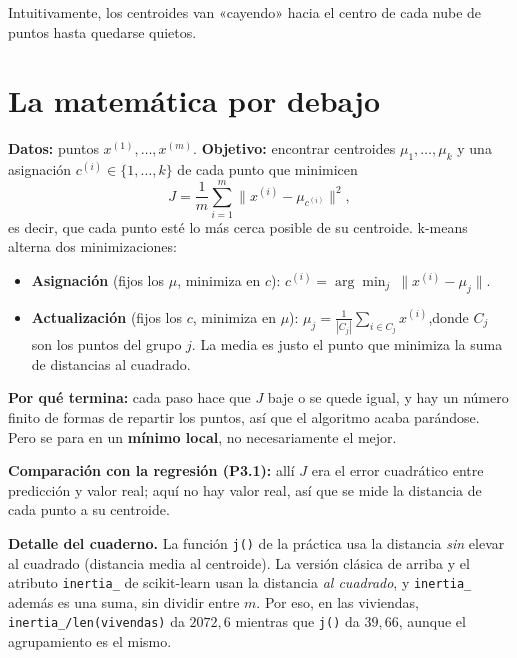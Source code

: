 \documentclass[a4paper,11pt]{article}
\begin{document}
Intuitivamente, los centroides van «cayendo» hacia el centro de cada nube de puntos hasta quedarse quietos.

\section{La matemática por debajo}

\textbf{Datos:} puntos $x^{(1)},\dots,x^{(m)}$. \textbf{Objetivo:} encontrar centroides $\mu_1,\dots,\mu_k$ y una
asignación $c^{(i)}\in\{1,\dots,k\}$ de cada punto que minimicen
\[
J=\frac{1}{m}\sum_{i=1}^{m}\bigl\lVert x^{(i)}-\mu_{c^{(i)}}\bigr\rVert^2 ,
\]
es decir, que cada punto esté lo más cerca posible de su centroide. k-means alterna dos minimizaciones:

\begin{itemize}
  \item \textbf{Asignación} (fijos los $\mu$, minimiza en $c$):\quad
        $c^{(i)}=\arg\min_{j}\ \lVert x^{(i)}-\mu_j\rVert$.
  \item \textbf{Actualización} (fijos los $c$, minimiza en $\mu$):\quad
        $\displaystyle \mu_j=\frac{1}{|C_j|}\sum_{i\in C_j}x^{(i)}$,\quad donde $C_j$ son los puntos del grupo $j$.
        La media es justo el punto que minimiza la suma de distancias al cuadrado.
\end{itemize}

\textbf{Por qué termina:} cada paso hace que $J$ baje o se quede igual, y hay un número finito de formas de repartir
los puntos, así que el algoritmo acaba parándose. Pero se para en un \textbf{mínimo local}, no necesariamente el mejor.

\textbf{Comparación con la regresión (P3.1):} allí $J$ era el error cuadrático entre predicción y valor real;
aquí no hay valor real, así que se mide la distancia de cada punto a su centroide.

\begin{ojo}
\textbf{Detalle del cuaderno.} La función \texttt{j()} de la práctica usa la distancia \emph{sin} elevar al cuadrado
(distancia media al centroide). La versión clásica de arriba y el atributo \texttt{inertia\_} de scikit-learn usan la
distancia \emph{al cuadrado}, y \texttt{inertia\_} además es una suma, sin dividir entre $m$. Por eso, en las viviendas,
\texttt{inertia\_/len(vivendas)} da $2072{,}6$ mientras que \texttt{j()} da $39{,}66$, aunque el agrupamiento es el mismo.
\end{ojo}
\end{document}
